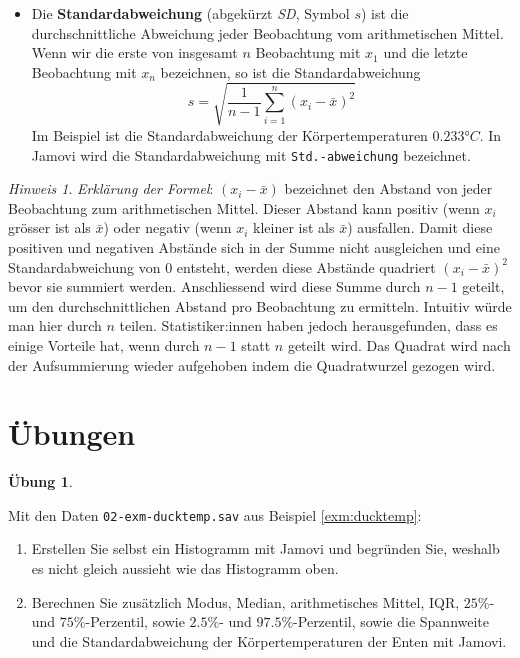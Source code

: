 \documentclass[
]{book}
\providecommand{\tightlist}{%
  \setlength{\itemsep}{0pt}\setlength{\parskip}{0pt}}
\theoremstyle{definition}
\theoremstyle{definition}
\theoremstyle{definition}
\newtheorem{exercise}{Übung}[chapter]
\theoremstyle{definition}
\theoremstyle{remark}
\newtheorem*{remark}{Hinweis}
\begin{document}
\begin{itemize}
\item
  \label{customdef-std}{Die \textbf{Standardabweichung} (abgekürzt \emph{SD}, Symbol \(s\)) ist die durchschnittliche Abweichung jeder Beobachtung vom arithmetischen Mittel.} Wenn wir die erste von insgesamt \(n\) Beobachtung mit \(x_1\) und die letzte Beobachtung mit \(x_n\) bezeichnen, so ist die Standardabweichung
  \begin{equation}
  s = \sqrt{\frac{1}{n-1}\sum^n_{i=1} (x_i-\bar{x})^2}
  \label{eq:sd}
  \end{equation}
  Im Beispiel ist die Standardabweichung der Körpertemperaturen \(0.233° C\). In Jamovi wird die Standardabweichung mit \texttt{Std.-abweichung} bezeichnet.
\end{itemize}

\begin{caution}

\begin{remark}
\emph{Erklärung der Formel}: \((x_i-\bar{x})\) bezeichnet den Abstand von jeder Beobachtung zum arithmetischen Mittel. Dieser Abstand kann positiv (wenn \(x_i\) grösser ist als \(\bar{x}\)) oder negativ (wenn \(x_i\) kleiner ist als \(\bar{x}\)) ausfallen. Damit diese positiven und negativen Abstände sich in der Summe nicht ausgleichen und eine Standardabweichung von 0 entsteht, werden diese Abstände quadriert \((x_i-\bar{x})^2\) bevor sie summiert werden. Anschliessend wird diese Summe durch \(n-1\) geteilt, um den durchschnittlichen Abstand pro Beobachtung zu ermitteln. Intuitiv würde man hier durch \(n\) teilen. Statistiker:innen haben jedoch herausgefunden, dass es einige Vorteile hat, wenn durch \(n-1\) statt \(n\) geteilt wird. Das Quadrat wird nach der Aufsummierung wieder aufgehoben indem die Quadratwurzel gezogen wird.
\end{remark}

\end{caution}

\section{Übungen}\label{intervallskaliertes-merkmal-uebungen}

\begin{exercise}
\protect\hypertarget{exr:enten-hist-mean-sd}{}\label{exr:enten-hist-mean-sd}\leavevmode

Mit den Daten \texttt{02-exm-ducktemp.sav} aus Beispiel \ref{exm:ducktemp}:

\begin{enumerate}
\def\labelenumi{(\alph{enumi})}
\tightlist
\item
  Erstellen Sie selbst ein Histogramm mit Jamovi und begründen Sie, weshalb es nicht gleich aussieht wie das Histogramm oben.
\item
  Berechnen Sie zusätzlich Modus, Median, arithmetisches Mittel, IQR, \(25\%\)- und \(75\%\)-Perzentil, sowie \(2.5\%\)- und \(97.5\%\)-Perzentil, sowie die Spannweite und die Standardabweichung der Körpertemperaturen der Enten mit Jamovi.
\end{enumerate}

\end{exercise}
\end{document}
